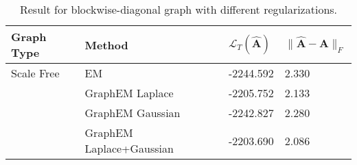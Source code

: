 \begin{table}[tb]
\caption{Result for blockwise-diagonal graph with different regularizations.}
\label{tab: prior results for block-diag}
\begin{tabular}{llll}
\toprule
\textbf{Graph Type} & \textbf{Method} & \textbf{$\mathcal{L}_T(\widehat{\mathbf{A}})$} & \textbf{$\| \widehat{\mathbf{A}} - \mathbf{A} \|_F$} \\
\midrule
Scale Free & EM & -2244.592 & 2.330 \\
 & GraphEM Laplace & -2205.752 & 2.133 \\
 & GraphEM Gaussian & -2242.827 & 2.280 \\
 & GraphEM Laplace+Gaussian & -2203.690 & 2.086 \\
\bottomrule
\end{tabular}
\end{table}
